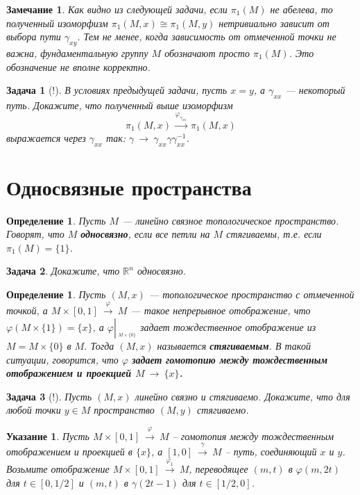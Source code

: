 \documentclass[12pt]{book}
\newcommand{\subs}{\section}
\newcommand{\arrow}{{\:\longrightarrow\:}}
\newcommand{\restrict}[1]{{\left|_{{\phantom{|}\!\!}_{#1}}\right.}}
\renewcommand{\phi}{\varphi}
\def\R{{\mathbb R}}
\theoremstyle{upshape}
\newtheorem{zadacha}{Задача}[chapter]
\theoremstyle{generic}
\newtheorem{opredelenie}[teorema]{Определение}
\theoremstyle{upshapenonumber}
\newtheorem{ukazanie}{Указание}[section]
\newtheorem{zamechanie}{Замечание}[chapter]
\newcommand{\следствие}{%
     \refstepcounter{teorema}
     {\noindent\bf Следствие \thechapter.\arabic{teorema}:\ }}
\newcommand{\пример}{%
     \refstepcounter{teorema}
     {\noindent\bf Пример \thechapter.\arabic{teorema}:\ }}
\newcommand{\лемма}{%
     \refstepcounter{teorema}
     {\noindent\bf Лемма \thechapter.\arabic{teorema}:\ }}
\newcommand{\теорема}{%
     \refstepcounter{teorema}
     {\noindent\bf Теорема \thechapter.\arabic{teorema}:\ }}
\newcommand{\утверждение}{%
     \refstepcounter{teorema}
     {\noindent\bf Утверждение \thechapter.\arabic{teorema}:\ }}
\begin{document}
{\begin{zamechanie}
Как видно из следующей задачи, если $\pi_1(M)$ не абелева, то
полученный изоморфизм $\pi_1(M, x)\cong \pi_1(M, y)$
нетривиально зависит от выбора пути $\gamma_{xy}$.
Тем не менее, когда зависимость от отмеченной
точки не важна, фундаментальную группу $M$ обозначают
просто $\pi_1(M)$. Это обозначение не вполне
корректно.
\end{zamechanie}

\begin{zadacha}[!]
В условиях предыдущей задачи,
пусть $x=y$, а $\gamma_{xx}$ --- некоторый путь. 
Докажите, что полученный выше 
изоморфизм \[ \pi_1(M, x)\stackrel{\phi_{\gamma_{xx}}}\arrow \pi_1(M, x)\]
выражается через $\gamma_{xx}$ так:
$\gamma \arrow \gamma_{xx} \gamma \gamma_{xx}^{-1}$.
\end{zadacha}

\subs{Односвязные пространства}


\begin{opredelenie}
Пусть $M$ --- линейно связное топологическое
пространство. Говорят, что $M$ {\bf односвязно},
если все петли на $M$ стягиваемы, т.е. 
если $\pi_1(M) = \{1\}$.
\end{opredelenie}

\begin{zadacha} Докажите, что $\R^n$ односвязно.
\end{zadacha}

\begin{opredelenie}
Пусть $(M, x)$ --- топологическое пространство с отмеченной точкой,
а $M \times [0,1] \stackrel \phi\arrow M$ --- такое непрерывное отображение, 
что $\phi(M\times \{1\}) = \{x\}$,
а $\phi \restrict{M\times \{0\}}$
задает тождественное отображение
из $M= M\times \{0\}$ в $M$. Тогда $(M,x)$
называется {\bf стягиваемым}.
В такой ситуации, говорится, что
$\phi$ {\bf задает гомотопию между тождественным
отображением и проекцией $M\arrow \{x\}$.}
\end{opredelenie}

\begin{zadacha}[!]
Пусть $(M, x)$ линейно связно и стягиваемо.
Докажите, что для любой
точки $y\in M$ пространство $(M, y)$ стягиваемо.
\end{zadacha}

\begin{ukazanie} 
Пусть $M \times [0,1] \stackrel \phi\arrow M$ --
гомотопия между тождественным отображением 
и проекцией в $\{x\}$, а $[1,0]\stackrel\gamma\arrow M$ --
путь, соединяющий $x$ и $y$. Возьмите отображение
$M \times [0,1] \overset{\phi_1}{\arrow} M$,
переводящее $(m, t)$ в $\phi(m, 2t)$
для $t\in [0,1/2]$ и $(m, t)$ в
$\gamma(2t-1)$ для $t\in [1/2,0]$.
\end{ukazanie}

}
\end{document}
